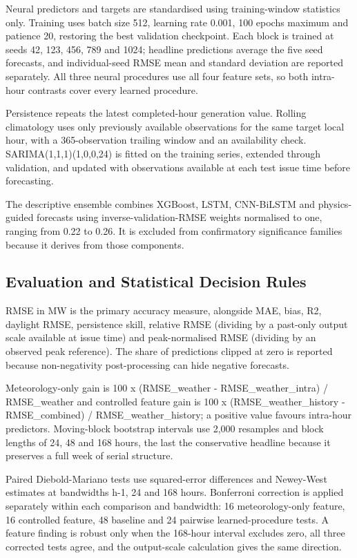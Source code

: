 Neural predictors and targets are standardised using training-window statistics only. Training uses batch size 512, learning rate 0.001, 100 epochs maximum and patience 20, restoring the best validation checkpoint. Each block is trained at seeds 42, 123, 456, 789 and 1024; headline predictions average the five seed forecasts, and individual-seed RMSE mean and standard deviation are reported separately. All three neural procedures use all four feature sets, so both intra-hour contrasts cover every learned procedure.

Persistence repeats the latest completed-hour generation value. Rolling climatology uses only previously available observations for the same target local hour, with a 365-observation trailing window and an availability check. SARIMA(1,1,1)(1,0,0,24) is fitted on the training series, extended through validation, and updated with observations available at each test issue time before forecasting.

The descriptive ensemble combines XGBoost, LSTM, CNN-\allowbreak{}BiLSTM and physics-guided forecasts using inverse-validation-RMSE weights normalised to one, ranging from 0.22 to 0.26. It is excluded from confirmatory significance families because it derives from those components.

\subsection{Evaluation and Statistical Decision Rules}

RMSE in MW is the primary accuracy measure, alongside MAE, bias, R2, daylight RMSE, persistence skill, relative RMSE (dividing by a past-only output scale available at issue time) and peak-normalised RMSE (dividing by an observed peak reference). The share of predictions clipped at zero is reported because non-negativity post-processing can hide negative forecasts.

Meteorology-only gain is 100 x (RMSE\_\allowbreak{}weather - RMSE\_\allowbreak{}weather\_\allowbreak{}intra) / RMSE\_\allowbreak{}weather and controlled feature gain is 100 x (RMSE\_\allowbreak{}weather\_\allowbreak{}history - RMSE\_\allowbreak{}combined) / RMSE\_\allowbreak{}weather\_\allowbreak{}history; a positive value favours intra-hour predictors. Moving-block bootstrap intervals use 2,000 resamples and block lengths of 24, 48 and 168 hours, the last the conservative headline because it preserves a full week of serial structure.

Paired Diebold-Mariano tests \cite{diebold1995comparing} use squared-error differences and Newey-West estimates at bandwidths h-1, 24 and 168 hours. Bonferroni correction is applied separately within each comparison and bandwidth: 16 meteorology-only feature, 16 controlled feature, 48 baseline and 24 pairwise learned-procedure tests. A feature finding is robust only when the 168-hour interval excludes zero, all three corrected tests agree, and the output-scale calculation gives the same direction.

